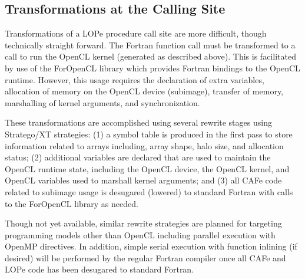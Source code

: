 \subsection{Transformations at the Calling Site}

Transformations of a LOPe procedure call site are more difficult, though technically straight
forward.  The Fortran function call must be transformed to a call to run the OpenCL kernel
(generated as described above).  This is facilitated by use of the ForOpenCL library which
provides Fortran bindings to the OpenCL runtime\cite{Sottile:2013:FTE:2441516.2441520}.  However,
this usage requires the declaration of extra variables, allocation of memory on the OpenCL device
(subimage), transfer of memory, marshalling of kernel arguments, and synchronization.

These transformations are accomplished using several rewrite stages using Stratego/XT strategies:
(1) a symbol table is produced in the first pass to store information related to arrays including,
array shape, halo size, and allocation status;
(2) additional variables are declared that are used to maintain the OpenCL runtime state, including
the OpenCL device, the OpenCL kernel, and OpenCL variables used to marshall kernel arguments; and
(3) all CAFe code related to subimage usage is desugared (lowered) to standard Fortran with calls to the
ForOpenCL library as needed.

Though not yet available, similar rewrite strategies are planned for targeting programming models
other than OpenCL including parallel execution with OpenMP directives.  In addition, simple serial
execution with function inlining (if desired) will be performed by the regular Fortran compiler once
all CAFe and LOPe code has been desugared to standard Fortran.



